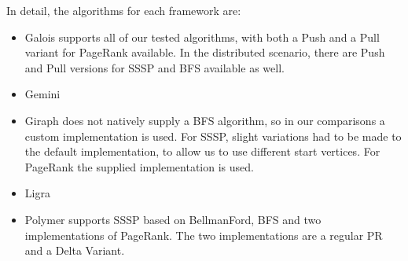 In detail, the algorithms for each framework are:
\begin{itemize}
	\item Galois supports all of our tested algorithms, with both a Push and a Pull variant for PageRank available. In the distributed scenario, there are Push and Pull versions for SSSP and BFS available as well.
	\item Gemini \todo{}
	\item Giraph does not natively supply a BFS algorithm, so in our comparisons a custom implementation is used. For SSSP, slight variations had to be made to the default implementation, to allow us to use different start vertices. For PageRank the supplied implementation is used.
	\item Ligra \todo{}
	\item Polymer supports SSSP based on BellmanFord, BFS and two implementations of PageRank. The two implementations are a regular PR and a Delta Variant.
\end{itemize}
